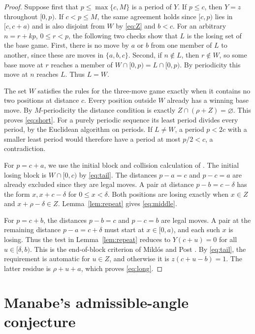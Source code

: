 \documentclass[11pt]{article}
\begin{document}
\begin{proof}
Suppose first that $p\le\max\{c,M\}$ is a period of $Y$. If
$p\le c$, then $Y=z$ throughout $[0,p)$. If $c<p\le M$, the
same agreement holds since $[c,p)$ lies in $[c,c+a)$ and is
also disjoint from $W$ by \eqref{eq:Z} and $b<c$. For an arbitrary
$n=r+kp$, $0\le r<p$, the following two checks show that $L$ is
the losing set of the base game. First, there is no move by $a$ or $b$
from one member of $L$ to another, since these are moves in
$\{a,b,c\}$. Second, if $n\notin L$, then $r\notin W$, so some
base move at $r$ reaches a member of $W\cap[0,p)=L\cap[0,p)$.
By periodicity this move at $n$ reaches $L$. Thus $L=W$.

The set $W$ satisfies the rules for the three-move game exactly when
it contains no two positions at distance $c$. Every position outside
$W$ already has a winning base move. By $M$-periodicity the distance
condition is exactly $Z\cap(\rho+Z)=\varnothing$. This proves
\eqref{eq:short}. For a purely periodic sequence its least period
divides every period, by the Euclidean algorithm on periods.
If $L\ne W$, a period $p<2c$ with a smaller least period would
therefore have a period at most $p/2<c$, a contradiction.

For $p=c+a$, we use the initial block and collision calculation of
\cite[Theorem~23]{manabe}. The initial losing block is $W\cap[0,c)$ by
\eqref{eq:tail}. The distances $p-a=c$ and $p-c=a$ are already
excluded since they are legal moves. A pair at distance $p-b=c-\delta$
has the form $x,x+c-\delta$ for $0\le x<\delta$. Both positions
are losing exactly when $x\in Z$ and $x+\rho-\delta\in Z$.
Lemma~\ref{lem:repeat} gives \eqref{eq:middle}.

For $p=c+b$, the distances $p-b=c$ and $p-c=b$ are legal moves.
A pair at the remaining distance $p-a=c+\delta$ must start at
$x\in[0,a)$, and each such $x$ is losing. Thus the test in
Lemma~\ref{lem:repeat} reduces to $Y(c+u)=0$ for all
$u\in[\delta,b)$. This is the end-of-block criterion of
Mikl\'os and Post \cite[Corollary~9.1]{miklos-post}.
By \eqref{eq:tail}, the requirement is automatic for $u\in Z$,
and otherwise it is $z(c+u-b)=1$. The latter residue is
$\rho+u+a$, which proves \eqref{eq:long}.
\end{proof}

\section{Manabe's admissible-angle conjecture}\label{sec:manabe}
\end{document}
